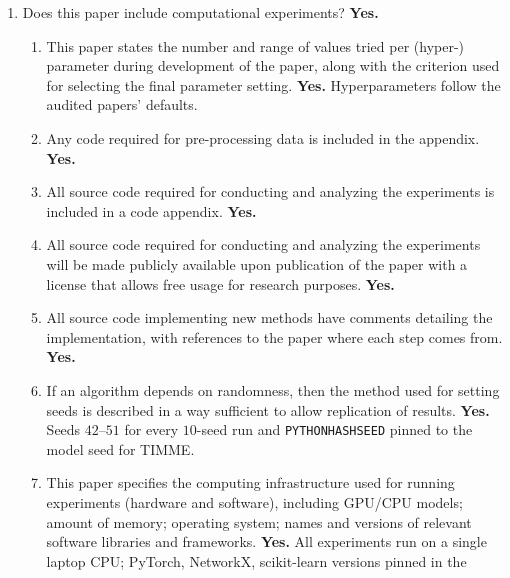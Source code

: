 \documentclass[letterpaper]{article} %
\begin{document}
\begin{enumerate}
\begin{enumerate}
  \item All datasets drawn from the existing literature are
    accompanied by appropriate citations. \textbf{Yes.}
  \item All datasets drawn from the existing literature are
    publicly available. \textbf{Yes.}
  \item All datasets that are not publicly available are
    described in detail, with explanation why publicly available
    alternatives are not scientifically satisficing.
    \textbf{Not applicable.}
  \end{enumerate}
\item Does this paper include computational experiments?
  \textbf{Yes.}
  \begin{enumerate}
  \item This paper states the number and range of values tried
    per (hyper-) parameter during development of the paper,
    along with the criterion used for selecting the final
    parameter setting. \textbf{Yes.} Hyperparameters follow the
    audited papers' defaults.
  \item Any code required for pre-processing data is included in
    the appendix. \textbf{Yes.}
  \item All source code required for conducting and analyzing
    the experiments is included in a code appendix. \textbf{Yes.}
  \item All source code required for conducting and analyzing
    the experiments will be made publicly available upon
    publication of the paper with a license that allows free
    usage for research purposes. \textbf{Yes.}
  \item All source code implementing new methods have comments
    detailing the implementation, with references to the paper
    where each step comes from. \textbf{Yes.}
  \item If an algorithm depends on randomness, then the method
    used for setting seeds is described in a way sufficient to
    allow replication of results. \textbf{Yes.} Seeds
    $42$--$51$ for every $10$-seed run and
    \texttt{PYTHONHASHSEED} pinned to the model seed for TIMME.
  \item This paper specifies the computing infrastructure used
    for running experiments (hardware and software), including
    GPU/CPU models; amount of memory; operating system; names
    and versions of relevant software libraries and frameworks.
    \textbf{Yes.} All experiments run on a single laptop CPU;
    PyTorch, NetworkX, scikit-learn versions pinned in the

\end{enumerate}
\end{enumerate}
\end{document}
